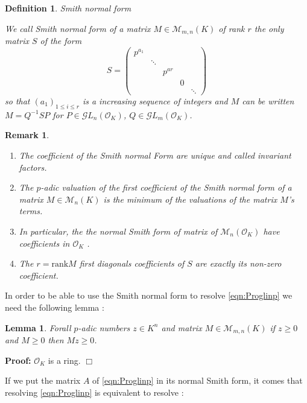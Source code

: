 \documentclass[a4paper,12pt]{article}
\newenvironment{proof}{\hbox{}\vspace{-0.5cm} {\bf Proof:}}{\hfill $\Box$ \\}
\newtheorem{lemma}{Lemma}
\newtheorem{definition}{Definition}
\newtheorem{remark}{Remark}
\newcommand{\OK}{\mathcal{O}_K}
\begin{document}
\begin{definition} Smith normal form
	
	We call {\it Smith normal form} of a matrix $M \in \mathcal{M}_{m,n}\left(K \right) $ of rank $r$ the only matrix $S$ of the form $$S =  
	\begin{pmatrix} p^{a_1} & \\
		& \ddots \\
		& & p^{ar}\\
		& & & 0\\
		& & & & \ddots \end{pmatrix} $$
	so that $(a_1)_{1\le i\le r}$ is a increasing sequence of integers and $M$ can be written $M =  Q^{-1} S P$ for $P \in \mathcal{G}L_n\left( \OK \right) $, $Q \in \mathcal{G}L_m\left( \OK \right) $.
\end{definition}

\begin{remark}
	\begin{enumerate}%
		\item The coefficient of the Smith normal Form are unique and called \textit{invariant factors}.
		\item The $p$-adic valuation of the first coefficient of the Smith normal form of a matrix $M \in \mathcal{M}_n \left( K \right) $ is the minimum of the valuations of the matrix $M$'s terms.
		\item In particular, the the normal Smith form of matrix of $\mathcal{M}_n \left( \OK \right) $ have coefficients in $\OK$ .
		\item The $r = \text{rank} M$ first diagonals coefficients of $S$ are exactly its non-zero coefficient.
	\end{enumerate}
	
\end{remark}

In order to be able to use the Smith normal form to resolve \ref{eqn:Proglinp} we need the following lemma :

\begin{lemma}
	Forall $p$-adic numbers $z \in K ^n$ and matrix $M \in \mathcal{M}_{m,n}\left( K  \right)  $ if $z\ge 0$ and $M\ge 0$ then $Mz\ge 0$.  
\end{lemma}
\begin{proof}
	$\OK$ is a ring.
\end{proof}


If we put the matrix $A$ of \ref{eqn:Proglinp} in its normal Smith form, it comes that resolving \ref{eqn:Proglinp} is equivalent to resolve :    
\end{document}
